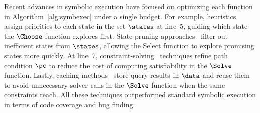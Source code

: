 Recent advances in symbolic execution have focused on optimizing each function in Algorithm~\ref{alg:symbexec} under a single budget. For example, heuristics~\cite{yao2025empc,featmaker} assign priorities to each state in the set $\states$ at line~5, guiding which state the $\Choose$ function explores first. State-pruning approaches~\cite{du2026fense,homi} filter out inefficient states from $\states$, allowing the Select function to explore promising states more quickly. At line~7, constraint-solving~\cite{symloc,mikek2024smt} techniques refine path condition $\pc$ to reduce the cost of computing satisfiability in the $\Solve$ function. Lastly, caching methods~\cite{shuai2024partial,klee_aaqc} store query results in $\data$ and reuse them to avoid unnecessary solver calls in the $\Solve$ function when the same constraints reach. All these techniques outperformed standard symbolic execution in terms of code coverage and bug finding.
\fi